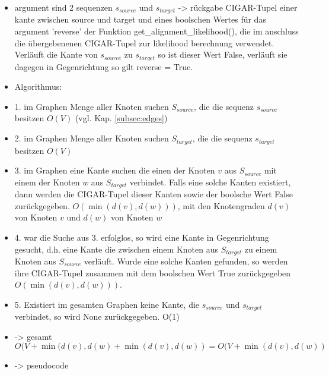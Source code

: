 \begin{itemize}
	\item argument sind 2 sequenzen $ s_{source} $ und $ s_{target} $ -> rückgabe CIGAR-Tupel einer kante zwischen source und target und eines boolschen Wertes für das argument 'reverse' der Funktion get\_alignment\_likelihood(), die im anschluss die übergebenenen CIGAR-Tupel zur likelihood berechnung verwendet. Verläuft die Kante von $ s_{source} $ zu $ s_{target} $ so ist dieser Wert False, verläuft sie dagegen in Gegenrichtung so gilt reverse = True. \\
    \item Algorithmus:
	\item 1. im Graphen Menge aller Knoten suchen $ S_{source} $, die die sequenz $ s_{source} $ besitzen $O(V)$ (vgl. Kap. \ref{subsec:edges}) \\
	\item 2. im Graphen Menge aller Knoten suchen $ S_{target} $, die die sequenz $ s_{target} $ besitzen $ O(V) $\\
	\item 3. im Graphen eine Kante suchen die einen der Knoten $v$ aus $ S_{source} $ mit einem der Knoten $w$ aus $ S_{target} $ verbindet. Falls eine solche Kanten existiert, dann werden die CIGAR-Tupel dieser Kanten sowie der boolsche Wert False zurückgegeben. $O(\min (d(v), d(w)))$, mit den Knotengraden $d(v) $von Knoten $v$ und $d(w) $ von Knoten $w$ ~\cite{docs_graph_tool}\\
	\item 4. war die Suche aus 3. erfolglos, so wird eine Kante in Gegenrichtung gesucht, d.h. eine Kante die zwischen einem Knoten aus $ S_{target} $ zu einem Knoten aus $ S_{source} $ verläuft. Wurde eine solche Kanten gefunden, so werden ihre CIGAR-Tupel zusammen mit dem boolschen Wert True zurückgegeben $O(\min (d(v), d(w)))$.\\
	\item 5. Existiert im gesamten Graphen keine Kante, die  $ s_{source} $ und $ s_{target} $ verbindet, so wird None zurückgegeben. O(1)\\
	\item -> gesamt $ O(V+\min (d(v), d(w)+\min (d(v), d(w)) = O(V+\min (d(v), d(w))$	\\
	\item -> pseudocode\\


\end{itemize}
